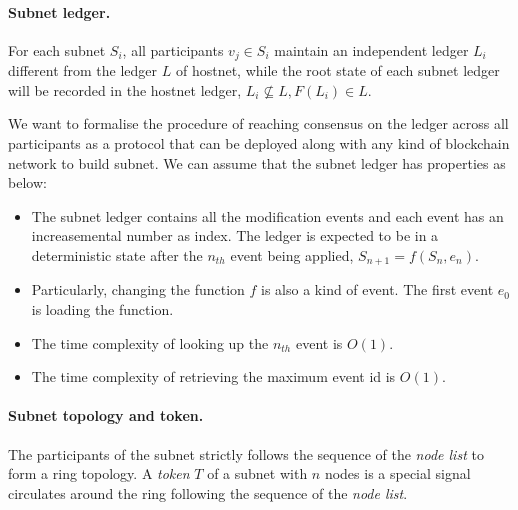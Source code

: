 \documentclass[11pt]{article}
\begin{document}
\paragraph{Subnet ledger.}
For each subnet $S_{i}$, all participants \(v_{j} \in S_{i}\) maintain an independent ledger $L_{i}$ different from the ledger $L$ of hostnet, while the root state of each subnet ledger will be recorded in the hostnet ledger, \( L_{i} \nsubseteq L, F(L_{i}) \in L \).

We want to formalise the procedure of reaching consensus on the ledger across all participants as a protocol that can be deployed along with any kind of blockchain network to build subnet. We can assume that the subnet ledger has properties as below:

\begin{itemize}
\item The subnet ledger contains all the modification events and each event has an increasemental number as index.
The ledger is expected to be in a deterministic state after the $n_{th}$ event being applied, \(S_{n+1} = f(S_{n}, e_{n})\).
\item Particularly, changing the function $f$ is also a kind of event. The first event $e_{0}$ is loading the function.
\item The time complexity of looking up the $n_{th}$ event is $O(1)$.
\item The time complexity of retrieving the maximum event id is $O(1)$.
\end{itemize}

\paragraph{Subnet topology and token.}
The participants of the subnet strictly follows the sequence of the \textit{node list} to form a ring topology.
A \textit{token} $T$ of a subnet with $n$ nodes is a special signal circulates around the ring following the sequence of the \textit{node list}.
\end{document}
